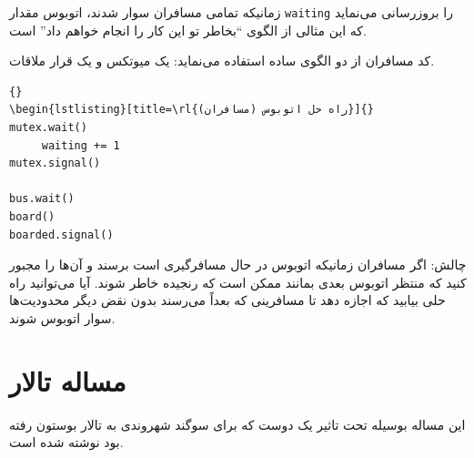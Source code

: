 \documentclass{book}
\newcommand{\clearemptydoublepage}{\newpage\cleardoublepage}
\begin{document}
    زمانیکه تمامی مسافران سوار شدند، اتوبوس مقدار  {\tt waiting} را بروزرسانی می‌نماید که این مثالی از الگوی ``بخاطر تو  این کار را انجام خواهم داد'' است. 

    کد مسافران از دو الگوی ساده استفاده می‌نماید: یک میوتکس و یک قرار ملاقات. 

\begin{latin}
\begin{lstlisting}[title={Bus problem solution (riders)}]{}
\begin{lstlisting}[title=\rl{راه حل اتوبوس (مسافران)}]{}
mutex.wait()
     waiting += 1
mutex.signal()

bus.wait()
board()
boarded.signal()
\end{lstlisting}
\end{latin}

    چالش: اگر مسافران زمانیکه اتوبوس در حال مسافرگیری است برسند و آن‌ها را مجبور کنید که منتظر اتوبوس بعدی بمانند ممکن است که رنجیده خاطر شوند. 
    آیا می‌توانید راه حلی بیابید که اجازه دهد تا مسافرینی که بعداً می‌رسند بدون نقض دیگر محدودیت‌ها سوار اتوبوس شوند. 
    


\clearemptydoublepage
\section{مساله تالار }

    این مساله بوسیله  تحت تاثیر یک دوست که  برای سوگند شهروندی به تالار   بوستون رفته بود نوشته شده است.
\end{document}
